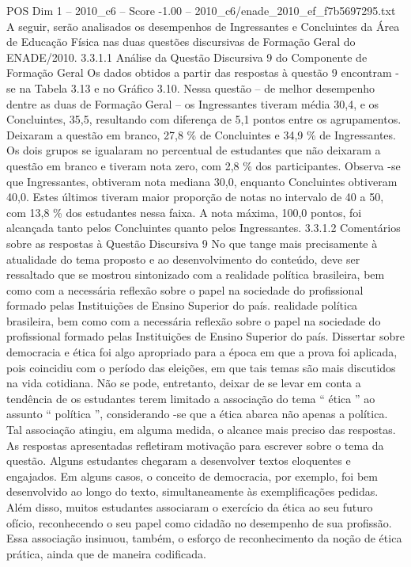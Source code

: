 \begin{textsample}{POS Dim 1 – 2010\_c6 – Score -1.00 – 2010\_c6/enade\_2010\_ef\_f7b5697295.txt}
A seguir, serão analisados os desempenhos de Ingressantes e Concluintes da Área de Educação Física nas duas questões discursivas de Formação Geral do ENADE/2010. 3.3.1.1 Análise da Questão Discursiva 9 do Componente de Formação Geral Os dados obtidos a partir das respostas à questão 9 encontram -se na Tabela 3.13 e no Gráfico 3.10.
Nessa questão – de melhor desempenho dentre as duas de Formação Geral – os Ingressantes tiveram média 30,4, e os Concluintes, 35,5, resultando com diferença de 5,1 pontos entre os agrupamentos.
Deixaram a questão em branco, 27,8 \% de Concluintes e 34,9 \% de Ingressantes.
Os dois grupos se igualaram no percentual de estudantes que não deixaram a questão em branco e tiveram nota zero, com 2,8 \% dos participantes.
Observa -se que Ingressantes, obtiveram nota mediana 30,0, enquanto Concluintes obtiveram 40,0.
Estes últimos tiveram maior proporção de notas no intervalo de 40 a 50, com 13,8 \% dos estudantes nessa faixa.
A nota máxima, 100,0 pontos, foi alcançada tanto pelos Concluintes quanto pelos Ingressantes. 3.3.1.2 Comentários sobre as respostas à Questão Discursiva 9 No que tange mais precisamente à atualidade do tema proposto e ao desenvolvimento do conteúdo, deve ser ressaltado que se mostrou sintonizado com a realidade política brasileira, bem como com a necessária reflexão sobre o papel na sociedade do profissional formado pelas Instituições de Ensino Superior do país. realidade política brasileira, bem como com a necessária reflexão sobre o papel na sociedade do profissional formado pelas Instituições de Ensino Superior do país.
Dissertar sobre democracia e ética foi algo apropriado para a época em que a prova foi aplicada, pois coincidiu com o período das eleições, em que tais temas são mais discutidos na vida cotidiana.
Não se pode, entretanto, deixar de se levar em conta a tendência de os estudantes terem limitado a associação do tema “ ética ” ao assunto “ política ”, considerando -se que a ética abarca não apenas a política.
Tal associação atingiu, em alguma medida, o alcance mais preciso das respostas.
As respostas apresentadas refletiram motivação para escrever sobre o tema da questão.
Alguns estudantes chegaram a desenvolver textos eloquentes e engajados.
Em alguns casos, o conceito de democracia, por exemplo, foi bem desenvolvido ao longo do texto, simultaneamente às exemplificações pedidas.
Além disso, muitos estudantes associaram o exercício da ética ao seu futuro ofício, reconhecendo o seu papel como cidadão no desempenho de sua profissão.
Essa associação insinuou, também, o esforço de reconhecimento da noção de ética prática, ainda que de maneira codificada.

\end{textsample}
